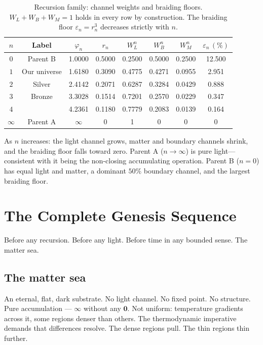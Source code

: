 \documentclass[prd,twocolumn,preprintnumbers,amsmath,amssymb]{revtex4-2}
\newcommand{\acc}{\mathbf{\infty}}
\newcommand{\inv}{\mathbf{0}}
\begin{document}
\begin{table}[t]
\caption{Recursion family: channel weights and braiding floors.
$W_L+W_B+W_M=1$ holds in every row by construction.
The braiding floor $\varepsilon_n = r_n^3$ decreases strictly with $n$.}
\label{tab:recursions}
\begin{ruledtabular}
\begin{tabular}{cccccccc}
$n$ & Label & $\varphi_n$ & $r_n$ &
$W_L^n$ & $W_B^n$ & $W_M^n$ & $\varepsilon_n\,(\%)$ \\
\hline
$0$ & Parent B  & 1.0000 & 0.5000 & 0.2500 & 0.5000 & 0.2500 & 12.500 \\
$1$ & Our universe & 1.6180 & 0.3090 & 0.4775 & 0.4271 & 0.0955 & 2.951 \\
$2$ & Silver   & 2.4142 & 0.2071 & 0.6287 & 0.3284 & 0.0429 & 0.888 \\
$3$ & Bronze   & 3.3028 & 0.1514 & 0.7201 & 0.2570 & 0.0229 & 0.347 \\
$4$ &          & 4.2361 & 0.1180 & 0.7779 & 0.2083 & 0.0139 & 0.164 \\
$\infty$ & Parent A  & $\infty$ & 0 & 1 & 0 & 0 & 0 \\
\end{tabular}
\end{ruledtabular}
\end{table}

As $n$ increases: the light channel grows, matter and boundary
channels shrink, and the braiding floor falls toward zero.
Parent A ($n \to \infty$) is pure light---consistent with it being
the non-closing accumulating operation.
Parent B ($n=0$) has equal light and matter, a dominant $50\%$
boundary channel, and the largest braiding floor.

\section{The Complete Genesis Sequence}
\label{sec:genesis}

Before any recursion. Before any light. Before time in any bounded
sense. The matter sea.

\subsection{The matter sea}

An eternal, flat, dark substrate. No light channel. No fixed point.
No structure. Pure accumulation --- $\acc$ without any $\inv$.
Not uniform: temperature gradients across it, some regions denser
than others. The thermodynamic imperative demands that differences
resolve. The dense regions pull. The thin regions thin further.
\end{document}
